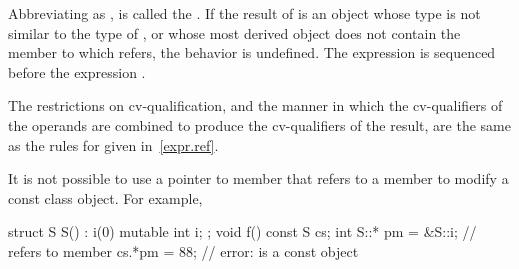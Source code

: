 \pnum
Abbreviating  as , 
is called the .
If the result of  is an object
whose type is not similar to the type of , or
whose most derived object does not
contain the member to which
 refers, the behavior is undefined.
%
%
%
%
%
The expression  is sequenced before the expression .

\pnum
The restrictions on cv-qualification, and the manner in which
the cv-qualifiers of the operands are combined to produce the
cv-qualifiers of the result, are the same as the rules for
 given in~\ref{expr.ref}.
\begin{note}
It is not possible to use a pointer to member that refers to a
 member to modify a const class object. For
example,
\begin{codeblock}
struct S {
  S() : i(0) { }
  mutable int i;
};
void f()
{
  const S cs;
  int S::* pm = &S::i;          //  refers to  member 
  cs.*pm = 88;                  // error:  is a const object
}
\end{codeblock}
\end{note}


